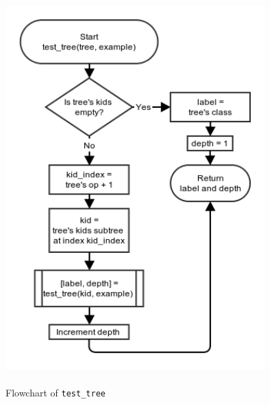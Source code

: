 \documentclass[10pt,a4paper]{article}
\begin{document}
\begin{figure}[!ht]
	\centering
	\includegraphics[height=15cm, width=10cm]{images/flow_chart/test_tree.png}
	\caption{Flowchart of \tt{test\_tree}}
	\label{fig:test_tree}
\end{figure}
\end{document}
